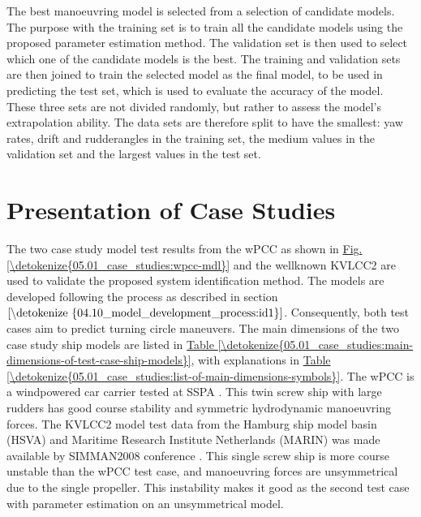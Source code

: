 \documentclass[review]{elsarticle}
\begin{document}
\sphinxAtStartPar
The best manoeuvring model is selected from a selection of candidate models. The purpose with the training set is to train all the candidate models using the proposed parameter estimation method. The validation set is then used to select which one of the candidate models is the best. The training and validation sets are then joined to train the selected model as the final model, to be used in predicting the test set, which is used to evaluate the accuracy of the model. These three sets are not divided randomly, but rather to assess the model’s extrapolation ability. The data sets are therefore split to have the smallest: yaw rates, drift\sphinxhyphen{} and rudder\sphinxhyphen{}angles in the training set, the medium values in the validation set and the largest values in the test set.


\section{Presentation of Case Studies}
\label{\detokenize{05.01_case_studies:presentation-of-case-studies}}\label{\detokenize{05.01_case_studies:case-studies}}\label{\detokenize{05.01_case_studies::doc}}
\sphinxAtStartPar
The two case study model test results from the wPCC as shown in \hyperref[\detokenize{05.01_case_studies:wpcc-mdl}]{Fig.\@ \ref{\detokenize{05.01_case_studies:wpcc-mdl}}} and the well\sphinxhyphen{}known KVLCC2 are used to validate the proposed system identification method.
The models are developed following the process as described in section \(\ref{\detokenize{04.10_model_development_process:id1}}\). Consequently, both test cases aim to predict turning circle maneuvers. The main dimensions of the two case study ship models are listed in \hyperref[\detokenize{05.01_case_studies:main-dimensions-of-test-case-ship-models}]{Table \ref{\detokenize{05.01_case_studies:main-dimensions-of-test-case-ship-models}}}, with explanations in \hyperref[\detokenize{05.01_case_studies:list-of-main-dimensions-symbols}]{Table \ref{\detokenize{05.01_case_studies:list-of-main-dimensions-symbols}}}. The wPCC is a wind\sphinxhyphen{}powered car carrier tested at SSPA \cite{alexandersson_wpcc_2022}. This twin screw ship with large rudders has good course stability and symmetric hydrodynamic manoeuvring forces. The KVLCC2 model test data from the Hamburg ship model basin (HSVA) and Maritime Research Institute Netherlands (MARIN) was made available by SIMMAN2008 conference \cite{stern_experience_2011}. This single screw ship is more course unstable than the wPCC test case, and manoeuvring forces are unsymmetrical due to the single propeller. This instability makes it good as the second test case with parameter estimation on an unsymmetrical model.
\end{document}
